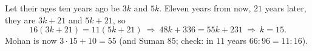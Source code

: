Let their ages ten years ago be $3k$ and $5k$. Eleven years from now, $21$ years later, they are $3k+21$ and $5k+21$, so
\[16(3k+21)=11(5k+21)\ \Longrightarrow\ 48k+336=55k+231\ \Longrightarrow\ k=15.\]
Mohan is now $3\cdot15+10=\boxed{55}$ (and Suman $85$; check: in $11$ years $66:96=11:16$).

